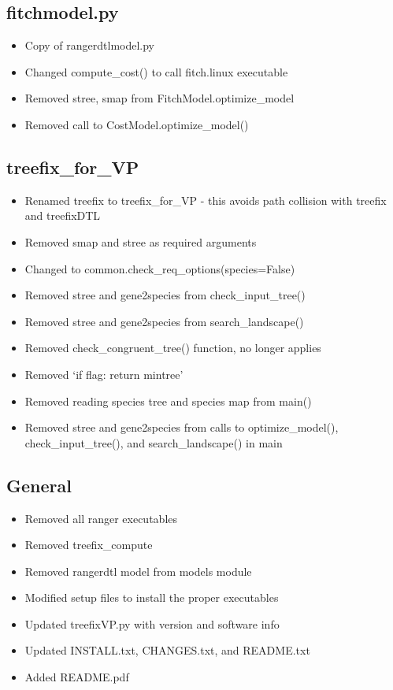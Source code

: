 \documentclass[11pt]{article}
\begin{document}
\subsection{fitchmodel.py}
\begin{itemize}
    \item Copy of rangerdtlmodel.py
    \item Changed compute{\_}cost() to call fitch.linux executable
    \item Removed stree, smap from FitchModel.optimize{\_}model
    \item Removed call to CostModel.optimize{\_}model()
\end{itemize}

\subsection{treefix{\_}for{\_}VP}
\begin{itemize}
    \item Renamed treefix to treefix{\_}for{\_}VP - this avoids path collision with treefix and treefixDTL
    \item Removed smap and stree as required arguments
    \item Changed to common.check{\_}req{\_}options(species=False)
    \item Removed stree and gene2species from check{\_}input{\_}tree()
    \item Removed stree and gene2species from search{\_}landscape()
    \item Removed check{\_}congruent{\_}tree() function, no longer applies
    \item Removed `if flag: return mintree'
    \item Removed reading species tree and species map from main()
    \item Removed stree and gene2species from calls to optimize{\_}model(), check{\_}input{\_}tree(), and search{\_}landscape() in main
\end{itemize}

\subsection{General}
\begin{itemize}
    \item Removed all ranger executables
    \item Removed treefix{\_}compute
    \item Removed rangerdtl model from models module
    \item Modified setup files to install the proper executables
    \item Updated treefixVP.py with version and software info
    \item Updated INSTALL.txt, CHANGES.txt, and README.txt
    \item Added README.pdf
\end{itemize}



\end{document}

